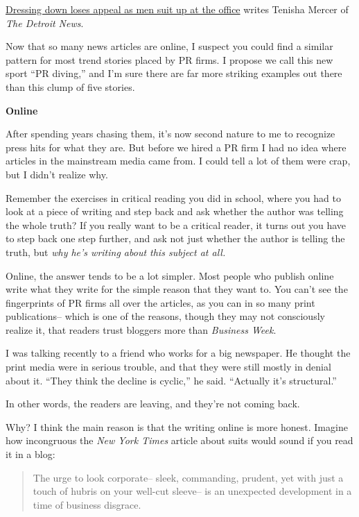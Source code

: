\href{http://www.detnews.com/2004/careers/0405/28/b01-149207.htm}{Dressing
down loses appeal as men suit up at the office} writes Tenisha Mercer of
\emph{The Detroit News}.

Now that so many news articles are online, I suspect you could find a
similar pattern for most trend stories placed by PR firms. I propose we
call this new sport ``PR diving,'' and I'm sure there are far more
striking examples out there than this clump of five stories.

\textbf{Online}

After spending years chasing them, it's now second nature to me to
recognize press hits for what they are. But before we hired a PR firm I
had no idea where articles in the mainstream media came from. I could
tell a lot of them were crap, but I didn't realize why.

Remember the exercises in critical reading you did in school, where you
had to look at a piece of writing and step back and ask whether the
author was telling the whole truth? If you really want to be a critical
reader, it turns out you have to step back one step further, and ask not
just whether the author is telling the truth, but \emph{why he's writing
about this subject at all.}

Online, the answer tends to be a lot simpler. Most people who publish
online write what they write for the simple reason that they want to.
You can't see the fingerprints of PR firms all over the articles, as you
can in so many print publications-- which is one of the reasons, though
they may not consciously realize it, that readers trust bloggers more
than \emph{Business Week}.

I was talking recently to a friend who works for a big newspaper. He
thought the print media were in serious trouble, and that they were
still mostly in denial about it. ``They think the decline is cyclic,''
he said. ``Actually it's structural.''

In other words, the readers are leaving, and they're not coming back.

Why? I think the main reason is that the writing online is more honest.
Imagine how incongruous the \emph{New York Times} article about suits
would sound if you read it in a blog:

\begin{quote}
The urge to look corporate-- sleek, commanding, prudent, yet with just a
touch of hubris on your well-cut sleeve-- is an unexpected development
in a time of business disgrace.
\end{quote}

